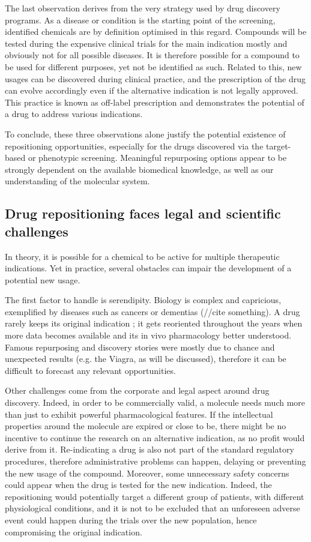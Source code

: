 The last observation derives from the very strategy used by drug discovery programs. As a disease or condition is the starting point of the screening, identified chemicals are by definition optimised in this regard. Compounds will be tested during the expensive clinical trials for the main indication mostly and obviously not for all possible diseases. It is therefore possible for a compound to be used for different purposes, yet not be identified as such. Related to this, new usages can be discovered during clinical practice, and the prescription of the drug can evolve accordingly even if the alternative indication is not legally approved. This practice is known as off-label prescription \citep{offlabelwiki} and demonstrates the potential of a drug to address various indications.

To conclude, these three observations alone justify the potential existence of repositioning opportunities, especially for the drugs discovered via the target-based or phenotypic screening. Meaningful repurposing options appear to be strongly dependent on the available biomedical knowledge, as well as our understanding of the molecular system.

\subsection{Drug repositioning faces legal and scientific challenges}

In theory, it is possible for a chemical to be active for multiple therapeutic indications. Yet in practice, several obstacles can impair the development of a potential new usage.

The first factor to handle is serendipity. Biology is complex and capricious, exemplified by diseases such as cancers or dementias (//cite something). A drug rarely keeps its original indication \citep{barratt2012drug}; it gets reoriented throughout the years when more data becomes available and its in vivo pharmacology better understood. Famous repurposing and discovery stories were mostly due to chance and unexpected results (e.g. the Viagra, as will be discussed), therefore it can be difficult to forecast any relevant opportunities.

Other challenges come from the corporate and legal aspect around drug discovery. Indeed, in order to be commercially valid, a molecule needs much more than just to exhibit powerful pharmacological features. If the intellectual properties around the molecule are expired or close to be, there might be no incentive to continue the research on an alternative indication, as no profit would derive from it. Re-indicating a drug is also not part of the standard regulatory procedures, therefore administrative problems can happen, delaying or preventing the new usage of the compound. Moreover, some unnecessary safety concerns could appear when the drug is tested for the new indication. Indeed, the repositioning would potentially target a different group of patients, with different physiological conditions, and it is not to be excluded that an unforeseen adverse event could happen during the trials over the new population, hence compromising the original indication.

